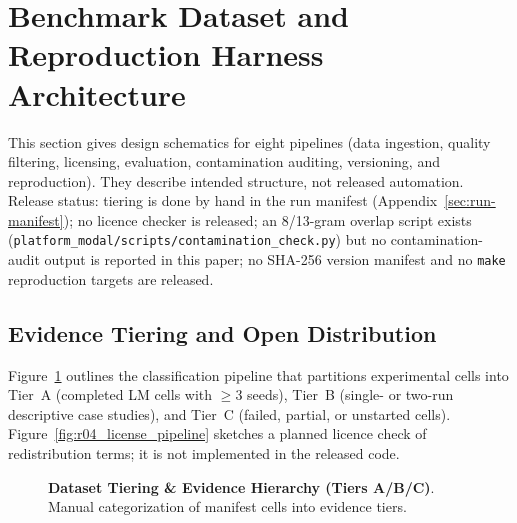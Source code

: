 \section{Benchmark Dataset and Reproduction Harness Architecture}
\label{sec:appendix:architecture}

This section gives design schematics for eight pipelines (data ingestion,
quality filtering, licensing, evaluation, contamination auditing, versioning,
and reproduction). They describe intended structure, not released
automation. Release status: tiering is done by hand in the run manifest
(Appendix~\ref{sec:run-manifest}); no licence checker is released; an
8/13-gram overlap script exists
(\texttt{platform\_modal/scripts/contamination\_check.py}) but no
contamination-audit output is reported in this paper; no SHA-256 version
manifest and no \texttt{make} reproduction targets are released.

\subsection{Evidence Tiering and Open Distribution}
Figure~\ref{fig:r04_dataset_tiering} outlines the classification pipeline
that partitions experimental cells into Tier~A (completed LM cells with
$\ge3$ seeds), Tier~B (single- or two-run descriptive case studies), and Tier~C
(failed, partial, or unstarted cells).
Figure~\ref{fig:r04_license_pipeline} sketches a planned licence check of
redistribution terms; it is not implemented in the released code.

\begin{figure}[htbp]
\centering
{}
\caption{\textbf{Dataset Tiering \& Evidence Hierarchy (Tiers A/B/C)}. Manual categorization of manifest cells into evidence tiers.}
\label{fig:r04_dataset_tiering}
\end{figure}

